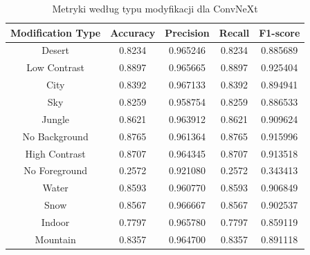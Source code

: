 \begin{table}
	\centering
	\begin{tabular}{|c|c|c|c|c|}
		\hline
		\textbf{Modification Type} & \textbf{Accuracy} & \textbf{Precision} & \textbf{Recall} & \textbf{F1-score} \\
		\hline
		Desert & 0.8234 & 0.965246 & 0.8234 & 0.885689 \\
		\hline
		Low Contrast & 0.8897 & 0.965665 & 0.8897 & 0.925404 \\
		\hline
		City & 0.8392 & 0.967133 & 0.8392 & 0.894941 \\
		\hline
		Sky & 0.8259 & 0.958754 & 0.8259 & 0.886533 \\
		\hline
		Jungle & 0.8621 & 0.963912 & 0.8621 & 0.909624 \\
		\hline
		No Background & 0.8765 & 0.961364 & 0.8765 & 0.915996 \\
		\hline
		High Contrast & 0.8707 & 0.964345 & 0.8707 & 0.913518 \\
		\hline
		No Foreground & 0.2572 & 0.921080 & 0.2572 & 0.343413 \\
		\hline
		Water & 0.8593 & 0.960770 & 0.8593 & 0.906849 \\
		\hline
		Snow & 0.8567 & 0.966667 & 0.8567 & 0.902537 \\
		\hline
		Indoor & 0.7797 & 0.965780 & 0.7797 & 0.859119 \\
		\hline
		Mountain & 0.8357 & 0.964700 & 0.8357 & 0.891118 \\
		\hline
	\end{tabular}
	\caption{Metryki według typu modyfikacji dla ConvNeXt}
	\label{tab:convnext_metrics_modification}
\end{table}

